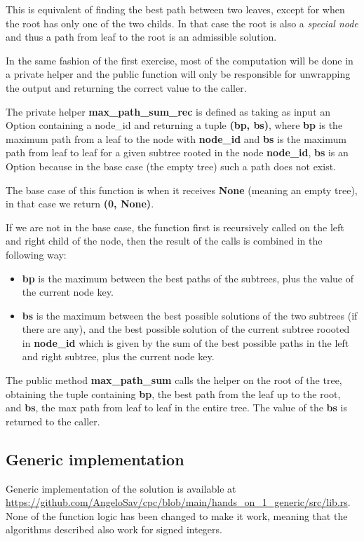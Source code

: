 \documentclass[12pt,a4paper]{article}
\begin{document}
This is equivalent of finding the best path between two leaves, except for when the root has only one of the two childs. In that case the root is also a \textit{special node} and thus a path from leaf to the root is an admissible solution. 

In the same fashion of the first exercise, most of the computation will be done in a private helper and the public function will only be responsible for unwrapping the output and returning the correct value to the caller.

The private helper \textbf{max\_path\_sum\_rec} is defined as taking as input an Option containing a node\_id and returning a tuple \textbf{(bp, bs)}, where \textbf{bp} is the maximum path from a leaf to the node with \textbf{node\_id} and \textbf{bs} is the maximum path from leaf to leaf for a given subtree rooted in the node \textbf{node\_id}, \textbf{bs} is an Option because in the base case (the empty tree) such a path does not exist.

The base case of this function is when it receives \textbf{None} (meaning an empty tree), in that case we return \textbf{(0, None)}.

If we are not in the base case, the function first is recursively called on the left and right child of the node, then the result of the calls is combined in the following way:

\begin{itemize}
    \item \textbf{bp} is the maximum between the best paths of the subtrees, plus the value of the current node key.
    \item \textbf{bs} is the maximum between the best possible solutions of the two subtrees (if there are any), and the best possible solution of the current subtree roooted in \textbf{node\_id} which is given by the sum of the best possible paths in the left and right subtree, plus the current node key. 
\end{itemize}

The public method \textbf{max\_path\_sum} calls the helper on the root of the tree, obtaining the tuple containing \textbf{bp}, the best path from the leaf up to the root, and \textbf{bs}, the max path from leaf to leaf in the entire tree. The value of the \textbf{bs} is returned to the caller.

\subsection*{Generic implementation}
Generic implementation of the solution is available at \url{https://github.com/AngeloSav/cpc/blob/main/hands_on_1_generic/src/lib.rs}.
None of the function logic has been changed to make it work, meaning that the algorithms described also work for signed integers.
\end{document}
